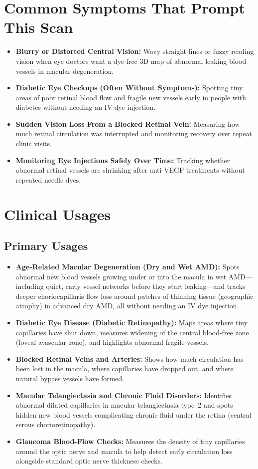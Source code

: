 \section{Common Symptoms That Prompt This Scan}
\begin{itemize}
\item \textbf{Blurry or Distorted Central Vision:} Wavy straight lines or fuzzy reading vision when eye doctors want a dye-free 3D map of abnormal leaking blood vessels in macular degeneration.
\item \textbf{Diabetic Eye Checkups (Often Without Symptoms):} Spotting tiny areas of poor retinal blood flow and fragile new vessels early in people with diabetes without needing an IV dye injection.
\item \textbf{Sudden Vision Loss From a Blocked Retinal Vein:} Measuring how much retinal circulation was interrupted and monitoring recovery over repeat clinic visits.
\item \textbf{Monitoring Eye Injections Safely Over Time:} Tracking whether abnormal retinal vessels are shrinking after anti-VEGF treatments without repeated needle dyes.
\end{itemize}

\section{Clinical Usages}

\subsection{Primary Usages}
\begin{itemize}
\item \textbf{Age-Related Macular Degeneration (Dry and Wet AMD):} Spots abnormal new blood vessels growing under or into the macula in wet AMD---including quiet, early vessel networks before they start leaking---and tracks deeper choriocapillaris flow loss around patches of thinning tissue (geographic atrophy) in advanced dry AMD, all without needing an IV dye injection.
\item \textbf{Diabetic Eye Disease (Diabetic Retinopathy):} Maps areas where tiny capillaries have shut down, measures widening of the central blood-free zone (foveal avascular zone), and highlights abnormal fragile vessels.
\item \textbf{Blocked Retinal Veins and Arteries:} Shows how much circulation has been lost in the macula, where capillaries have dropped out, and where natural bypass vessels have formed.
\item \textbf{Macular Telangiectasia and Chronic Fluid Disorders:} Identifies abnormal dilated capillaries in macular telangiectasia type~2 and spots hidden new blood vessels complicating chronic fluid under the retina (central serous chorioretinopathy).
\item \textbf{Glaucoma Blood-Flow Checks:} Measures the density of tiny capillaries around the optic nerve and macula to help detect early circulation loss alongside standard optic nerve thickness checks.
\end{itemize}

